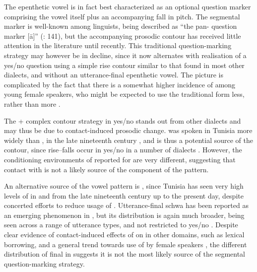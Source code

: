 \documentclass[output=paper]{langsci/langscibook}
\begin{document}
The  epenthetic vowel is in fact best characterized as an optional question marker comprising the vowel itself plus an accompanying fall in pitch. The segmental marker is well-known among  linguists, being described as “the pan- question marker  [ā]” (\citealt{HerinZammit2017}: 141), but the accompanying prosodic contour has received little attention in the literature until recently. This traditional question-marking strategy may however be in decline, since it now alternates with realisation of a yes/no question using a simple rise contour similar to that found in most other  dialects, and without an utterance-final epenthetic vowel. The picture is complicated by the fact that there is a somewhat higher incidence of  among young female speakers, who might be expected to use the traditional form less, rather than more \citep{Hellmuthforthcomingtunisianyesno}. 

The  + complex contour strategy in  yes/no  stands out from other  dialects and may thus be due to contact-induced prosodic change.  was spoken in Tunisia more widely than , in the late nineteenth century \citep{Sayahi2011}, and is thus a potential source of the contour, since rise--falls occur in yes/no  in a number of  dialects \citep{GiliFivelaEtAl2015}. However, the conditioning environments of  reported for  are very different, suggesting that contact with  is not a likely source of the  component of the  pattern.

An alternative source of the vowel  pattern is , since Tunisia has seen very high levels of  in  and  from the late nineteenth century up to the present day, despite concerted efforts to reduce usage of  \citep{Daoud2007}. Utterance-final schwa  has been reported as an emerging phenomenon in  \citep{Hansen1997}, but its distribution is again much broader, being seen across a range of utterance types, and not restricted to yes/no . Despite clear evidence of contact-induced effects of  on  in other domains, such as lexical borrowing, and a general trend towards use of  by female speakers \citep{Walters2011}, the different distribution of final  in  suggests it is not the most likely source of the  segmental question-marking strategy. 
\end{document}
